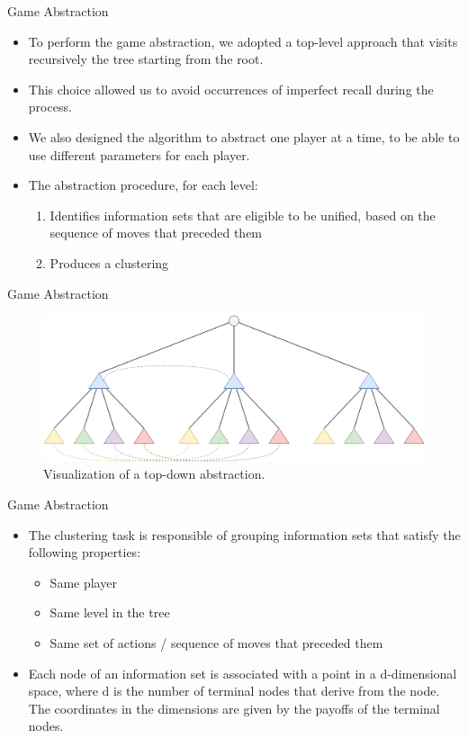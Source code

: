 \documentclass[11pt]{beamer}
\begin{document}
\begin{frame}{Game Abstraction}
\begin{itemize}
\item To perform the game abstraction, we adopted a top-level approach that visits recursively the tree starting from the root. 
\item This choice allowed us to avoid occurrences of imperfect recall during the process.
\item We also designed the algorithm to abstract one player at a time, to be able to use different parameters for each player.
\item The abstraction procedure, for each level:
\begin{enumerate}
\item Identifies information sets that are eligible to be unified, based on the sequence of moves that preceded them
\item Produces a clustering
\end{enumerate}
\end{itemize}
\end{frame}

\begin{frame}{Game Abstraction}
\begin{figure}[hbtp]
		\centering
		\includegraphics[scale=0.2]{images/img_04.png}
		\caption{Visualization of a top-down abstraction.}
\end{figure}
\end{frame}

\begin{frame}{Game Abstraction}
\begin{itemize}
\item The clustering task is responsible of grouping information sets that satisfy the following properties:
\begin{itemize}
\item Same player
\item Same level in the tree
\item Same set of actions / sequence of moves that preceded them
\end{itemize}
\item Each node of an information set is associated with a point in a d-dimensional space, where d is the number of terminal nodes that derive from the node. The coordinates in the dimensions are given by the payoffs of the terminal nodes.
\end{itemize}
\end{frame}
\end{document}
